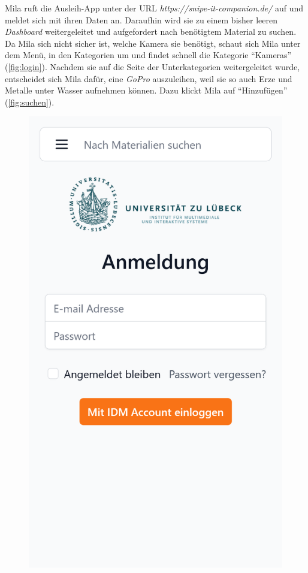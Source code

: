 Mila ruft die Ausleih-App unter der URL \textit{https://snipe-it-companion.de/} auf und meldet sich
mit ihren Daten an. Daraufhin wird sie zu einem bisher leeren \textit{Dashboard} weitergeleitet und
aufgefordert nach benötigtem Material zu suchen. Da Mila sich nicht sicher ist, welche Kamera sie
benötigt, schaut sich Mila unter dem Menü, in den Kategorien um und findet schnell die Kategorie
\enquote{Kameras} (\ref{fig:login}). Nachdem sie auf die Seite der Unterkategorien weitergeleitet
wurde, entscheidet sich Mila dafür, eine \textit{GoPro} auszuleihen, weil sie so auch Erze und
Metalle unter Wasser aufnehmen können. Dazu klickt Mila auf \enquote{Hinzufügen} (\ref{fig:suchen}).
\begin{figure}[p]
    \centering
    \includegraphics[scale=0.17]{Bilder/Dialgobeispiel/Login.png}\hspace{1em}

\end{figure}
